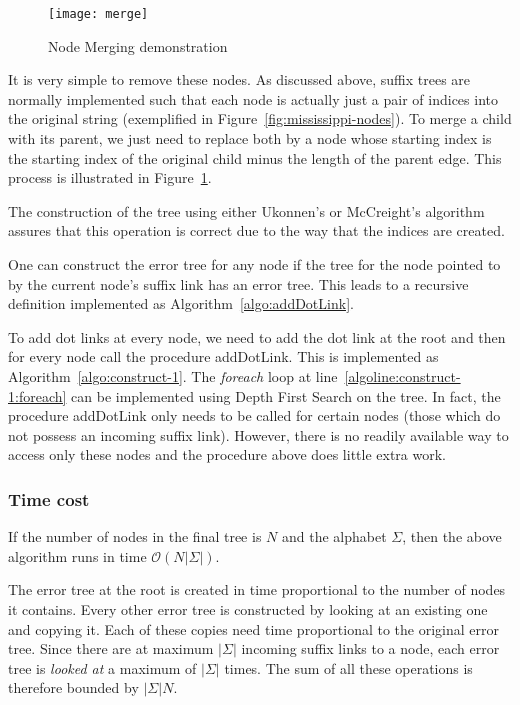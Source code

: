 \begin{figure}
\centering
\texttt{[image: merge]}
\caption{Node Merging demonstration}%
\label{fig:merge}
\end{figure}

It is very simple to remove these nodes. As discussed above, suffix trees are normally implemented such that each node is actually just a pair of indices into the original string (exemplified in Figure~\ref{fig:mississippi-nodes}). To merge a child with its parent, we just need to replace both by a node whose starting index is the starting index of the original child minus the length of the parent edge. This process is illustrated in Figure~\ref{fig:merge}.

The construction of the tree using either Ukonnen's or McCreight's algorithm assures that this operation is correct due to the way that the indices are created.



One can construct the error tree for any node if the tree for the node pointed to by the current node's suffix link has an error tree. This leads to a recursive definition implemented as Algorithm~\ref{algo:addDotLink}. 



To add dot links at every node, we need to add the dot link at the root and then for every node call the procedure addDotLink. This is implemented as Algorithm~\ref{algo:construct-1}. The \textit{foreach} loop at line~\ref{algoline:construct-1:foreach} can be implemented using Depth First Search on the tree. In fact, the procedure addDotLink only needs to be called for certain nodes (those which do not possess an incoming suffix link). However, there is no readily available way to access only these nodes and the procedure above does little extra work.

\subsubsection{Time cost}

If the number of nodes in the final tree is $N$ and the alphabet $\Sigma$, then the above algorithm runs in time $\mathcal{O}(N|\Sigma|)$.

The error tree at the root is created in time proportional to the number of nodes it contains. Every other error tree is constructed by looking at an existing one and copying it. Each of these copies need time proportional to the original error tree. Since there are at maximum $|\Sigma|$ incoming suffix links to a node, each error tree is \emph{looked at} a maximum of $|\Sigma|$ times. The sum of all these operations is therefore bounded by $|\Sigma|N$.

